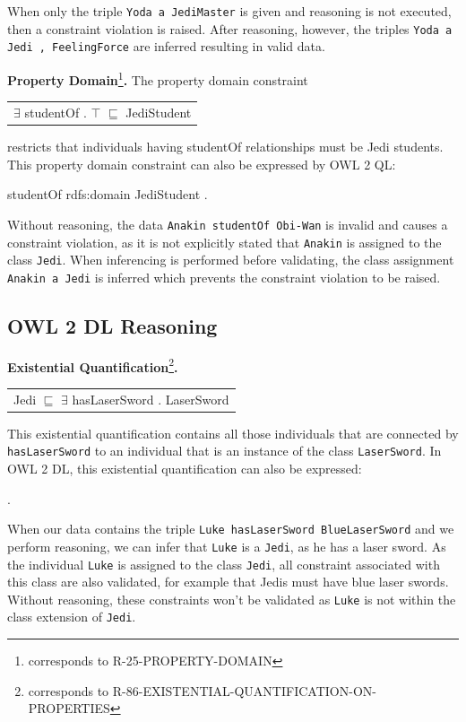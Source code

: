 \documentclass{llncs}
\newcommand{\ms}[1]{\texttt{#1}}
\newenvironment{DL}{
  \scriptsize
  \sffamily
  \vspace{0.3cm}
  \begin{tabular}{l}

}{
  \end{tabular}
  \linebreak
}
\begin{document}
When only the triple \ms{Yoda a JediMaster} is given and reasoning is not executed, then a constraint violation is raised.
After reasoning, however, the triples \ms{Yoda a Jedi , FeelingForce} are inferred resulting in valid data. 

\textbf{Property Domain}\footnote{corresponds to R-25-PROPERTY-DOMAIN}\textbf{.}
The property domain constraint

\begin{DL}
$\exists$ studentOf . $\top$ $\sqsubseteq$ JediStudent \\
\end{DL}

restricts that individuals having studentOf relationships must be Jedi students.
This property domain constraint can also be expressed by OWL 2 QL:

\begin{ex}
studentOf rdfs:domain JediStudent .
\end{ex}

Without reasoning, the data \ms{Anakin studentOf Obi-Wan} is invalid and causes a constraint violation, as it is not explicitly stated that \ms{Anakin} is assigned to the class \ms{Jedi}. 
When inferencing is performed before validating, the class assignment \ms{Anakin a Jedi} is inferred which prevents the constraint violation to be raised.

\subsection{OWL 2 DL Reasoning}

\textbf{Existential Quantification}\footnote{corresponds to R-86-EXISTENTIAL-QUANTIFICATION-ON-PROPERTIES}\textbf{.}

\begin{DL}
Jedi $\sqsubseteq$ $\exists$ hasLaserSword . LaserSword
\end{DL}

This existential quantification contains all those individuals that are connected by \ms{hasLaserSword} to an individual that is an instance of the class \ms{LaserSword}.
In OWL 2 DL, this existential quantification can also be expressed:

\begin{ex}
 .
\end{ex}

When our data contains the triple \ms{Luke hasLaserSword BlueLaserSword} and we perform reasoning, we can infer that \ms{Luke} is a \ms{Jedi}, as he has a laser sword.
As the individual \ms{Luke} is assigned to the class \ms{Jedi}, all constraint associated with this class are also validated, for example that Jedis must have blue laser swords.
Without reasoning, these constraints won't be validated as \ms{Luke} is not within the class extension of \ms{Jedi}.
\end{document}
